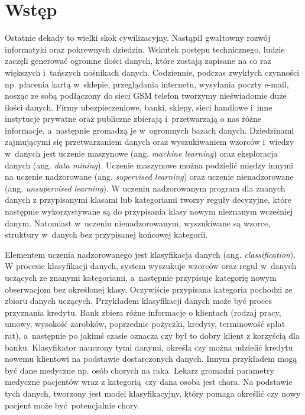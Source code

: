 \chapter*{Wstęp}
Ostatnie dekady to wielki skok cywilizacyjny. Nastąpił gwałtowny rozwój informatyki oraz pokrewnych dziedzin. Wskutek postępu technicznego, ludzie zaczęli generować ogromne ilości danych, które zostają zapisane na co raz większych i~tańszych nośnikach danych. Codziennie, podczas zwykłych czynności np. płacenia kartą w~sklepie, przeglądania internetu, wysyłania poczty e-mail, nosząc ze sobą podłączony do sieci GSM telefon tworzymy nieświadomie duże ilości danych. Firmy ubezpieczeniowe, banki, sklepy, sieci handlowe i~inne instytucje prywatne oraz publiczne zbierają i~przetwarzają o nas różne informacje, a~następnie gromadzą je w~ogromnych bazach danych. Dziedzinami zajmującymi się przetwarzaniem danych oraz wyszukiwaniem wzorców i~wiedzy w~danych jest uczenie maszynowe (ang. \textit{machine learning}) oraz eksploracja danych (ang. \textit{data mining}). Uczenie maszynowe można podzielić między innymi na uczenie nadzorowane (ang. \textit{supervised learning}) oraz uczenie nienadzorowane (ang. \textit{unsupervised learning}). W uczeniu nadzorowanym program dla znanych danych z przypisanymi klasami lub kategoriami tworzy reguły decyzyjne, które następnie wykorzystywane są do przypisania klasy nowym nieznanym wcześniej danym. Natomiast w~uczeniu nienadzorowanym, wyszukiwane są wzorce, struktury w~danych bez przypisanej końcowej kategorii. \par 
Elementem uczenia nadzorowanego jest klasyfikacja danych (ang. \textit{classification}). W procesie klasyfikacji danych, system wyszukuje wzorców oraz reguł w~danych uczących ze znanymi kategoriami, a~następnie przypisuje kategorię nowym obserwacjom bez określonej klasy. Oczywiście przypisana kategoria pochodzi ze zbioru danych uczących. Przykładem klasyfikacji danych może być proces przyznania kredytu. Bank zbiera różne informacje o klientach (rodzaj pracy, umowy, wysokość zarobków, poprzednie pożyczki, kredyty, terminowość spłat rat), a~następnie po jakimś czasie oznacza czy był to dobry klient z korzyścią dla banku. Klasyfikator nauczony tymi danymi, określa czy można udzielić kredytu nowemu klientowi na podstawie dostarczonych danych. Innym przykładem mogą być dane medyczne np. osób chorych na raka. Lekarz gromadzi parametry medyczne pacjentów wraz z kategorią czy dana osoba jest chora. Na podstawie tych danych, tworzony jest model klasyfikacyjny, który pomaga określić czy nowy pacjent może być potencjalnie chory.\par 
